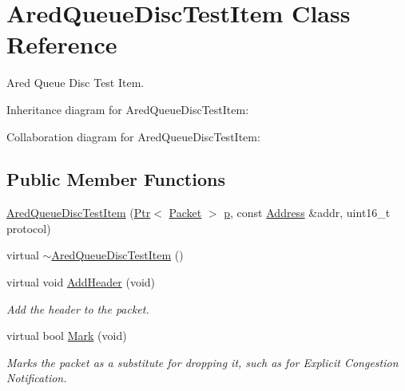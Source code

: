 \hypertarget{classAredQueueDiscTestItem}{}\section{Ared\+Queue\+Disc\+Test\+Item Class Reference}
\label{classAredQueueDiscTestItem}


Ared Queue Disc Test Item.  




Inheritance diagram for Ared\+Queue\+Disc\+Test\+Item\+:


Collaboration diagram for Ared\+Queue\+Disc\+Test\+Item\+:
\subsection*{Public Member Functions}
\begin{DoxyCompactItemize}
\item 
\hyperlink{classAredQueueDiscTestItem_a9a30f11a9b79b41d2aa5622cda812315}{Ared\+Queue\+Disc\+Test\+Item} (\hyperlink{classns3_1_1Ptr}{Ptr}$<$ \hyperlink{classns3_1_1Packet}{Packet} $>$ \hyperlink{lte__link__budget__x2__handover__measures_8m_ac9de518908a968428863f829398a4e62}{p}, const \hyperlink{classns3_1_1Address}{Address} \&addr, uint16\+\_\+t protocol)
\item 
virtual \hyperlink{classAredQueueDiscTestItem_acd17508d633642ea75173b95c4931366}{$\sim$\+Ared\+Queue\+Disc\+Test\+Item} ()
\item 
virtual void \hyperlink{classAredQueueDiscTestItem_a6d91edf2daa474208ecc008a94c18946}{Add\+Header} (void)
\begin{DoxyCompactList}\small\item\em Add the header to the packet. \end{DoxyCompactList}\item 
virtual bool \hyperlink{classAredQueueDiscTestItem_a2bf5305b0f5ab789651eb999a064e9f7}{Mark} (void)
\begin{DoxyCompactList}\small\item\em Marks the packet as a substitute for dropping it, such as for Explicit Congestion Notification. \end{DoxyCompactList}\end{DoxyCompactItemize}

